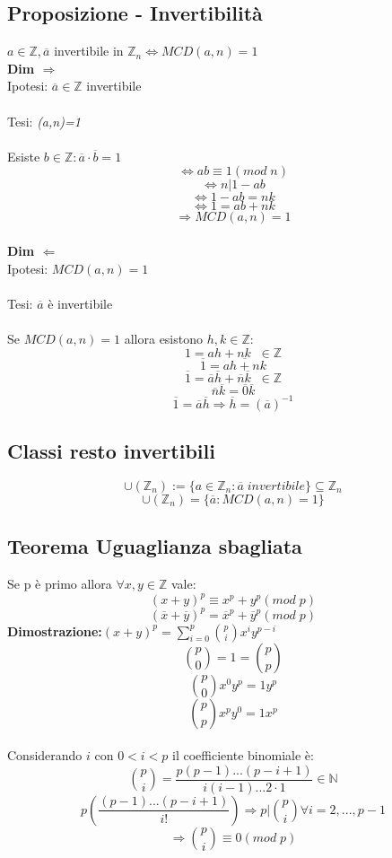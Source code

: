 \subsection{Proposizione - Invertibilità}
\(a\in\mathbb{Z}, \overline{a}\) invertibile in \(\mathbb{Z}_n\Leftrightarrow MCD(a,n)=1\)
\\
\textbf{Dim \(\Rightarrow\)}
\\Ipotesi: \(\overline{a}\in\mathbb{Z}\) invertibile
\\\\Tesi: \textit{(a,n)=1}
\\\\Esiste \(b\in\mathbb{Z}: \overline{a}\cdot\overline{b}=1\) 
\[\Leftrightarrow ab\equiv 1(mod\;n)\]
\[\Leftrightarrow n|1-ab\]
\[\Leftrightarrow  1-ab=nk\]
\[\Leftrightarrow 1=ab+nk\]
\[\Rightarrow MCD(a,n)=1 \]
\\
\textbf{Dim \(\Leftarrow\)} 
\\Ipotesi: \(MCD(a,n)=1\)
\\\\Tesi: \(\overline{a}\) è invertibile
\\\\Se \(MCD(a,n)=1\) allora esistono \(h,k\in\mathbb{Z}:\)
\[1=ah+nk\;\;\in\mathbb{Z}\]
\[\overline{1}=\overline{ah+nk}\]
\[\overline{1}=\overline{a}\overline{h}+\overline{n}\overline{k}\;\;\in\mathbb{Z}\]
\[\overline{n}\overline{k}=\overline{0}\overline{k}\]
\[\overline{1}=\overline{a}\overline{h}\Rightarrow\overline{h}=(\overline{a})^{-1}\]

\subsection{Classi resto invertibili}
\[\cup (\mathbb{Z}_n):=\{a\in\mathbb{Z}_n:\overline{a}\;invertibile\}\subseteq\mathbb{Z}_n\]
\[\cup (\mathbb{Z}_n)=\{\overline{a}: MCD(a,n)=1\}\]

\subsection{Teorema Uguaglianza sbagliata}
Se p è primo allora \(\forall x,y\in\mathbb{Z}\) vale:
\[(x+y)^p\equiv x^p+y^p(mod\;p)\]
\[(\overline{x}+\overline{y})^p=\overline{x}^p+\overline{y}^p(mod\;p)\]
\textbf{Dimostrazione:}\((x+y)^p=\sum ^p_{i=0}\binom{p}{i}x^iy^{p-i}\)
\[\binom{p}{0}=1=\binom{p}{p}\]
\[\binom{p}{0}x^0y^p=1y^p\]
\[\binom{p}{p}x^py^0=1x^p\]
\\
Considerando $i$ con \(0<i<p\) il coefficiente binomiale è:
\[\binom{p}{i}=\frac{p(p-1)...(p-i+1)}{i(i-1)...2\cdot 1}\in\mathbb{N}\]
\[p(\frac{(p-1)...(p-i+1)}{i!})\Rightarrow p|\binom{p}{i}\forall i=2,...,p-1\]
\[\Rightarrow\binom{p}{i}\equiv 0(mod\;p)\]

